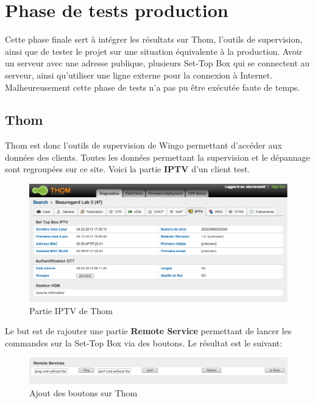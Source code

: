 
\chapter{Phase de tests production}
Cette phase finale sert à intégrer les résultats sur Thom, l'outils de supervision, ainsi que de tester le projet sur une situation équivalente à la production. Avoir un serveur avec une adresse publique, plusieurs Set-Top Box qui se connectent au serveur, ainsi qu'utiliser une ligne externe pour la connexion à Internet. Malheureusement cette phase de tests n'a pas pu être exécutée faute de temps.

\section{Thom}
Thom est donc l'outils de supervision de Wingo permettant d'accéder aux données des clients. Toutes les données permettant la supervision et le dépannage sont regroupées sur ce site. Voici la partie \textbf{IPTV} d'un client test.

\begin{figure}[H]
      \centering
      \includegraphics[width=\textwidth]{00_media/thom_iptv}
      \caption{Partie IPTV de Thom}
      \label{gra:maqmenu}
\end{figure}

Le but est de rajouter une partie \textbf{Remote Service} permettant de lancer les commandes sur la Set-Top Box via des boutons. Le résultat est le suivant:

\begin{figure}[H]
      \centering
      \includegraphics[width=\textwidth]{00_media/thom_remote}
      \caption{Ajout des boutons sur Thom}
      \label{gra:maqmenu}
\end{figure}


